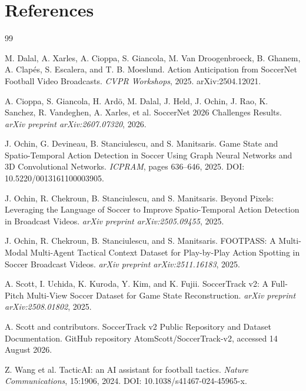 \documentclass[11pt,a4paper]{article}
\begin{document}
\section*{References}
\begin{thebibliography}{99}

M. Dalal, A. Xarles, A. Cioppa, S. Giancola, M. Van Droogenbroeck, B. Ghanem, A. Clapés, S. Escalera, and T. B. Moeslund.
\newblock Action Anticipation from SoccerNet Football Video Broadcasts.
\newblock \emph{CVPR Workshops}, 2025. arXiv:2504.12021.

A. Cioppa, S. Giancola, H. Ardö, M. Dalal, J. Held, J. Ochin, J. Rao, K. Sanchez, R. Vandeghen, A. Xarles, et al.
\newblock SoccerNet 2026 Challenges Results.
\newblock \emph{arXiv preprint arXiv:2607.07320}, 2026.

J. Ochin, G. Devineau, B. Stanciulescu, and S. Manitsaris.
\newblock Game State and Spatio-Temporal Action Detection in Soccer Using Graph Neural Networks and 3D Convolutional Networks.
\newblock \emph{ICPRAM}, pages 636--646, 2025. DOI: 10.5220/0013161100003905.

J. Ochin, R. Chekroun, B. Stanciulescu, and S. Manitsaris.
\newblock Beyond Pixels: Leveraging the Language of Soccer to Improve Spatio-Temporal Action Detection in Broadcast Videos.
\newblock \emph{arXiv preprint arXiv:2505.09455}, 2025.

J. Ochin, R. Chekroun, B. Stanciulescu, and S. Manitsaris.
\newblock FOOTPASS: A Multi-Modal Multi-Agent Tactical Context Dataset for Play-by-Play Action Spotting in Soccer Broadcast Videos.
\newblock \emph{arXiv preprint arXiv:2511.16183}, 2025.

A. Scott, I. Uchida, K. Kuroda, Y. Kim, and K. Fujii.
\newblock SoccerTrack v2: A Full-Pitch Multi-View Soccer Dataset for Game State Reconstruction.
\newblock \emph{arXiv preprint arXiv:2508.01802}, 2025.

A. Scott and contributors.
\newblock SoccerTrack v2 Public Repository and Dataset Documentation.
\newblock GitHub repository AtomScott/SoccerTrack-v2, accessed 14 August 2026.

Z. Wang et al.
\newblock TacticAI: an AI assistant for football tactics.
\newblock \emph{Nature Communications}, 15:1906, 2024. DOI: 10.1038/s41467-024-45965-x.


\end{thebibliography}
\end{document}
